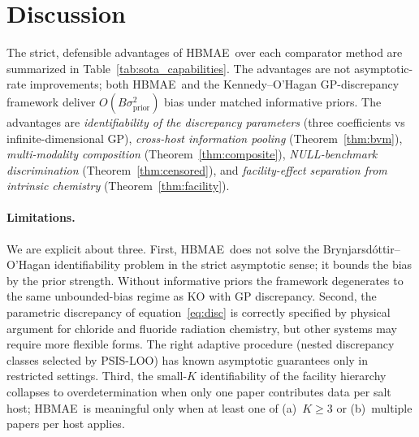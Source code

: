 \documentclass[12pt]{article}
\theoremstyle{plain}
\theoremstyle{definition}
\theoremstyle{remark}
\newcommand{\HBMAE}{HBMAE\xspace}
\begin{document}
\section{Discussion}\label{sec:discussion}

The strict, defensible advantages of \HBMAE\ over each comparator method
are summarized in Table~\ref{tab:sota_capabilities}.  The advantages are
not asymptotic-rate improvements; both \HBMAE\ and the Kennedy--O'Hagan
GP-discrepancy framework deliver $O(B\sigma_{\mathrm{prior}}^2)$ bias under
matched informative priors.  The advantages are
\emph{identifiability of the discrepancy parameters} (three coefficients vs
infinite-dimensional GP), \emph{cross-host information pooling}
(Theorem~\ref{thm:bvm}), \emph{multi-modality composition}
(Theorem~\ref{thm:composite}), \emph{NULL-benchmark discrimination}
(Theorem~\ref{thm:censored}), and \emph{facility-effect separation from
intrinsic chemistry} (Theorem~\ref{thm:facility}).

\paragraph{Limitations.}  We are explicit about three.  First, \HBMAE\ does
not solve the Brynjarsd\'ottir--O'Hagan identifiability problem in the
strict asymptotic sense; it bounds the bias by the prior strength.
Without informative priors the framework degenerates to the same
unbounded-bias regime as KO with GP discrepancy.  Second, the parametric
discrepancy of equation~\eqref{eq:disc} is correctly specified by physical
argument for chloride and fluoride radiation chemistry, but other systems
may require more flexible forms.  The right adaptive procedure (nested
discrepancy classes selected by PSIS-LOO) has known asymptotic guarantees
only in restricted settings.  Third, the small-$K$ identifiability of the
facility hierarchy collapses to overdetermination when only one paper
contributes data per salt host; \HBMAE\ is meaningful only when at least
one of (a)~$K\ge 3$ or (b)~multiple papers per host applies.
\end{document}
